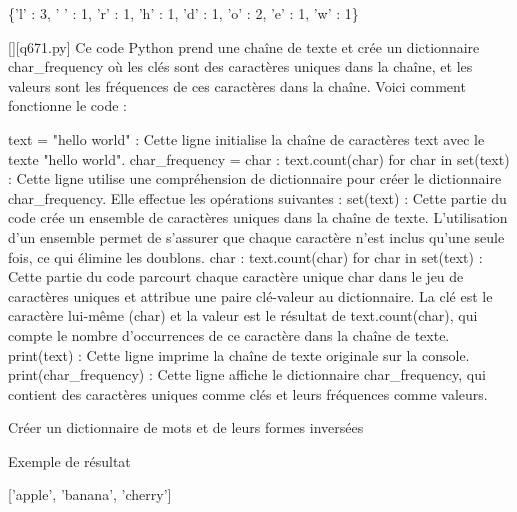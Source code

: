 \{'l' : 3, ' ' : 1, 'r' : 1, 'h' : 1, 'd' : 1, 'o' : 2, 'e' : 1, 'w' : 1\}
        \par
        \begin{solution}
            \renewcommand{\nomfichier}{q671.py}
            \pythonfile{\chemincode \nomfichier}[][\nomfichier]
            Ce code Python prend une chaîne de texte et crée un dictionnaire char_frequency où les clés sont des caractères uniques dans la chaîne, et les valeurs sont les fréquences de ces caractères dans la chaîne. Voici comment fonctionne le code :

    text = "hello world" : Cette ligne initialise la chaîne de caractères text avec le texte "hello world".
    char_frequency = {char : text.count(char) for char in set(text)} : Cette ligne utilise une compréhension de dictionnaire pour créer le dictionnaire char_frequency. Elle effectue les opérations suivantes :
        set(text) : Cette partie du code crée un ensemble de caractères uniques dans la chaîne de texte. L'utilisation d'un ensemble permet de s'assurer que chaque caractère n'est inclus qu'une seule fois, ce qui élimine les doublons.
        {char : text.count(char) for char in set(text)} : Cette partie du code parcourt chaque caractère unique char dans le jeu de caractères uniques et attribue une paire clé-valeur au dictionnaire. La clé est le caractère lui-même (char) et la valeur est le résultat de text.count(char), qui compte le nombre d'occurrences de ce caractère dans la chaîne de texte.
    print(text) : Cette ligne imprime la chaîne de texte originale sur la console.
    print(char_frequency) : Cette ligne affiche le dictionnaire char_frequency, qui contient des caractères uniques comme clés et leurs fréquences comme valeurs.
        \end{solution}
        

        \question
        Créer un dictionnaire de mots et de leurs formes inversées

Exemple de résultat

['apple', 'banana', 'cherry']

